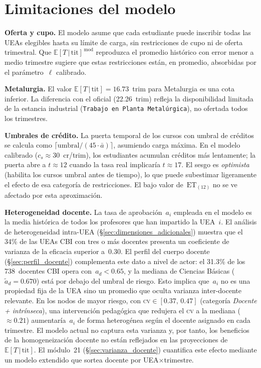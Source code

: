 \documentclass[11pt,letterpaper]{article}
\newcommand{\uea}[1]{\texttt{#1}}
\newcommand{\ET}[1]{\mathrm{ET}_{(#1)}}
\newcommand{\ETtit}{\mathbb{E}[T\,|\,\mathrm{tit}]}
\begin{document}
\section{Limitaciones del modelo}
\label{sec:limitaciones}

\textbf{Oferta y cupo.}
El modelo asume que cada estudiante puede inscribir todas las UEAs elegibles
hasta su límite de carga, sin restricciones de cupo ni de oferta trimestral.
Que $\ETtit^{\,\mathrm{mod}}$ reproduzca el promedio histórico con error menor
a medio trimestre sugiere que estas restricciones están, en promedio, absorbidas
por el parámetro~$\ell$ calibrado.

\textbf{Metalurgia.}
El valor $\ETtit=16.73$~trim para Metalurgia es una cota inferior.
La diferencia con el oficial (22.26~trim) refleja la disponibilidad limitada
de la estancia industrial (\uea{Trabajo en Planta Metalúrgica}), no ofertada
todos los trimestres.

\textbf{Umbrales de crédito.}
La puerta temporal de los cursos con umbral de créditos se calcula como
$\lceil\mathrm{umbral}/(45\cdot\bar{a})\rceil$, asumiendo carga máxima.
En el modelo calibrado ($c_s\approx 30$~cr/trim), los estudiantes acumulan
créditos más lentamente; la puerta abre a $t\approx 12$ cuando la tasa real
implicaría $t\approx 17$.
El sesgo es \emph{optimista} (habilita los cursos umbral antes de tiempo),
lo que puede subestimar ligeramente el efecto de esa categoría de restricciones.
El bajo valor de~$\ET{12}$ no se ve afectado por esta aproximación.

\textbf{Heterogeneidad docente.}
La tasa de aprobación~$a_i$ empleada en el modelo es la media histórica de todos los
profesores que han impartido la UEA~$i$.
El análisis de heterogeneidad intra-UEA (\S\ref{sec:dimensiones_adicionales}) muestra
que el 34\% de las UEAs CBI con tres o más docentes presenta un coeficiente de
varianza de la eficacia superior a~0.30.
El perfil del cuerpo docente (\S\ref{sec:perfil_docente}) complementa este dato a nivel
de actor: el 31.3\% de los 738~docentes CBI opera con~$a_d < 0.65$, y la mediana
de Ciencias Básicas ($\tilde{a}_d=0.670$) está por debajo del umbral de riesgo.
Esto implica que~$a_i$ no es una propiedad fija de la UEA sino un promedio que oculta
varianza inter-docente relevante.
En los nodos de mayor riesgo, con \textsc{cv}$\in[0.37,\,0.47]$ (categoría
\emph{Docente + intrínseca}), una intervención pedagógica que redujera el \textsc{cv}
a la mediana ($\approx0.21$) aumentaría~$a_i$ de forma heterogénea según el docente
asignado en cada trimestre.
El modelo actual no captura esta varianza y, por tanto, los beneficios de la
homogeneización docente no están reflejados en las proyecciones de~$\ETtit$.
El módulo~21 (\S\ref{sec:varianza_docente}) cuantifica este efecto mediante un
modelo extendido que sortea docente por UEA$\times$trimestre.
\end{document}
